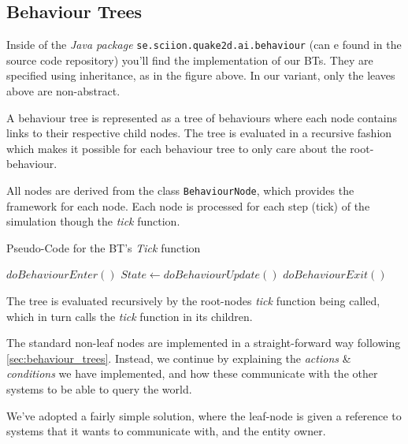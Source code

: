 \documentclass[a4paper, twocolumn]{article}
\begin{document}
        \subsection{Behaviour Trees} \label{sec:behaviour_trees_implementation}

        Inside of the \emph{Java package} \texttt{se.sciion.quake2d.ai.behaviour} (can e found in the source code repository) you'll find the implementation of our BTs. They are specified using inheritance, as in the figure above. In our variant, only the leaves above are non-abstract.

        A behaviour tree is represented as a tree of behaviours where each node contains links to their respective child nodes. The tree is evaluated in a recursive fashion which makes it possible for each behaviour tree to only care about the root-behaviour.

        All nodes are derived from the class \texttt{BehaviourNode}, which provides the framework for each node. Each node is processed for each step (tick) of the simulation though the \emph{tick} function.

        \begin{algorithm}[H]
            \caption{Pseudo-Code for the BT's \emph{Tick} function}
            \label{alg:behaviour_tree_update}
            \begin{algorithmic}
                    \STATE \(doBehaviourEnter()\)
                \ENDIF
                \STATE \(State \leftarrow doBehaviourUpdate()\)
                    \STATE \(doBehaviourExit()\)
                \ENDIF
            \end{algorithmic}
        \end{algorithm}
        The tree is evaluated recursively by the root-nodes \emph{tick} function being called, which in turn calls the \emph{tick} function in its children.

        The standard non-leaf nodes are implemented in a straight-forward way following \cref{sec:behaviour_trees}. Instead, we continue by explaining the \emph{actions} \& \emph{conditions} we have implemented, and how these communicate with the other systems to be able to query the world.

        We've adopted a fairly simple solution, where the leaf-node is given a reference to systems that it wants to communicate with, and the entity owner.
\end{document}
